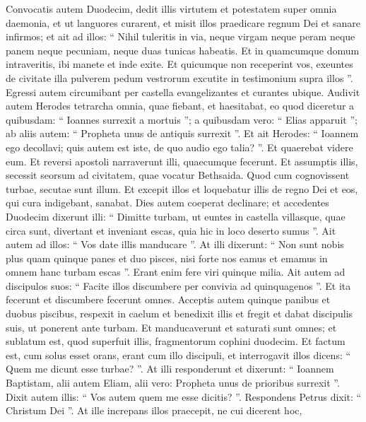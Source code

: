 \begin{biblechapter}
\begin{biblechapter}
\begin{biblechapter}
\begin{biblechapter}
\begin{biblechapter}
\begin{biblechapter}
\begin{biblechapter}
\begin{biblechapter}
\begin{biblechapter}
\verse Convocatis autem Duodecim, dedit illis virtutem et potestatem super omnia daemonia, et ut languores curarent, 
\verse et misit illos praedicare regnum Dei et sanare infirmos; 
\verse et ait ad illos: “ Nihil tuleritis in via, neque virgam neque peram neque panem neque pecuniam, neque duas tunicas habeatis. 
 \verse Et in quamcumque domum intraveritis, ibi manete et inde exite. 
\verse Et quicumque non receperint vos, exeuntes de civitate illa pulverem pedum vestrorum excutite in testimonium supra illos ”. 
\verse Egressi autem circumibant per castella evangelizantes et curantes ubique.
 \verse Audivit autem Herodes tetrarcha omnia, quae fiebant, et haesitabat, eo quod diceretur a quibusdam: “ Ioannes surrexit a mortuis ”; 
\verse a quibusdam vero: “ Elias apparuit ”; ab aliis autem: “ Propheta unus de antiquis surrexit ”. 
\verse Et ait Herodes: “ Ioannem ego decollavi; quis autem est iste, de quo audio ego talia? ”. Et quaerebat videre eum. 
\verse Et reversi apostoli narraverunt illi, quaecumque fecerunt. Et assumptis illis, secessit seorsum ad civitatem, quae vocatur Bethsaida. 
\verse Quod cum cognovissent turbae, secutae sunt illum. Et excepit illos et loquebatur illis de regno Dei et eos, qui cura indigebant, sanabat. 
\verse Dies autem coeperat declinare; et accedentes Duodecim dixerunt illi: “ Dimitte turbam, ut euntes in castella villasque, quae circa sunt, divertant et inveniant escas, quia hic in loco deserto sumus ”. 
\verse Ait autem ad illos: “ Vos date illis manducare ”. At illi dixerunt: “ Non sunt nobis plus quam quinque panes et duo pisces, nisi forte nos eamus et emamus in omnem hanc turbam escas ”. 
\verse Erant enim fere viri quinque milia. Ait autem ad discipulos suos: “ Facite illos discumbere per convivia ad quinquagenos ”. 
\verse Et ita fecerunt et discumbere fecerunt omnes. 
\verse Acceptis autem quinque panibus et duobus piscibus, respexit in caelum et benedixit illis et fregit et dabat discipulis suis, ut ponerent ante turbam. 
\verse Et manducaverunt et saturati sunt omnes; et sublatum est, quod superfuit illis, fragmentorum cophini duodecim.
 \verse Et factum est, cum solus esset orans, erant cum illo discipuli, et interrogavit illos dicens: “ Quem me dicunt esse turbae? ”. 
\verse At illi responderunt et dixerunt: “ Ioannem Baptistam, alii autem Eliam, alii vero: Propheta unus de prioribus surrexit ”. 
\verse Dixit autem illis: “ Vos autem quem me esse dicitis? ”. Respondens Petrus dixit: “ Christum Dei ”. 
\verse At ille increpans illos praecepit, ne cui dicerent hoc, 

\end{biblechapter}
\end{biblechapter}
\end{biblechapter}
\end{biblechapter}
\end{biblechapter}
\end{biblechapter}
\end{biblechapter}
\end{biblechapter}
\end{biblechapter}
